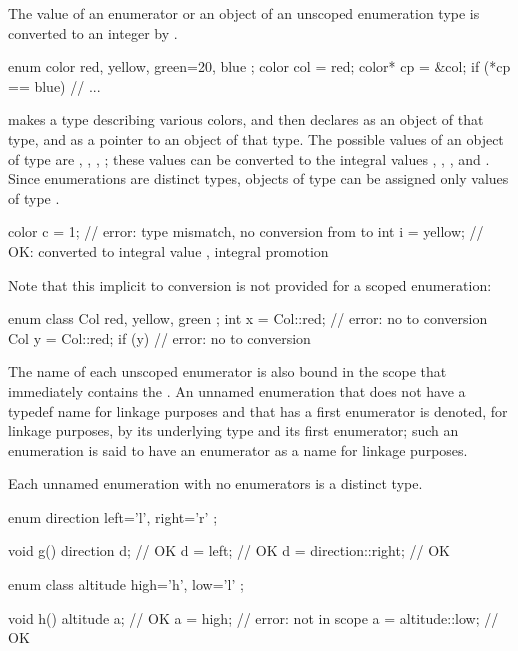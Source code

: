 \pnum
The value of an enumerator or an object of an unscoped enumeration type is
converted to an integer by .
\begin{example}
\begin{codeblock}
enum color { red, yellow, green=20, blue };
color col = red;
color* cp = &col;
if (*cp == blue)                // ...
\end{codeblock}
makes  a type describing various colors, and then declares
 as an object of that type, and  as a pointer to an
object of that type. The possible values of an object of type
 are , , ,
; these values can be converted to the integral values
, , , and . Since enumerations are
distinct types, objects of type  can be assigned only
values of type .
\begin{codeblock}
color c = 1;                    // error: type mismatch, no conversion from  to 
int i = yellow;                 // OK:  converted to integral value , integral promotion
\end{codeblock}
Note that this implicit  to 
conversion is not provided for a scoped enumeration:
\begin{codeblock}
enum class Col { red, yellow, green };
int x = Col::red;               // error: no  to  conversion
Col y = Col::red;
if (y) { }                      // error: no  to  conversion
\end{codeblock}
\end{example}

\pnum
{}%
The name of each unscoped enumerator is also bound
in the scope that immediately contains the .
An unnamed enumeration
that does not have a typedef name for linkage purposes and
that has a first enumerator
is denoted, for linkage purposes,
by its underlying type and its first enumerator;
such an enumeration is said to have
an enumerator as a name for linkage purposes.
\begin{note}
Each unnamed enumeration with no enumerators is a distinct type.
\end{note}
\begin{example}
\begin{codeblock}
enum direction { left='l', right='r' };

void g()  {
  direction d;                  // OK
  d = left;                     // OK
  d = direction::right;         // OK
}

enum class altitude { high='h', low='l' };

void h()  {
  altitude a;                   // OK
  a = high;                     // error:  not in scope
  a = altitude::low;            // OK
}
\end{codeblock}
\end{example}

